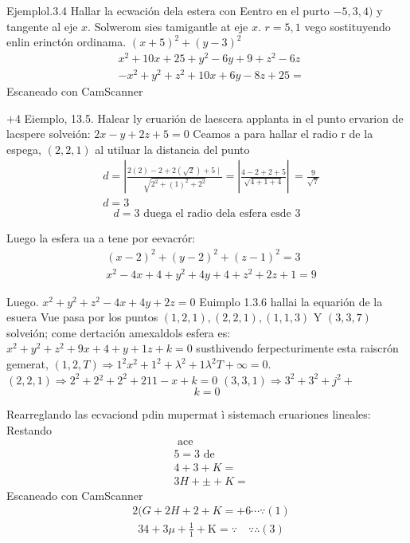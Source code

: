 Ejemplol.3.4 Hallar la ecwación dela estera con Eentro en el purto $-5,3,4)$ y tangente al eje $x$. Solwerom sies tamigantle at eje $x$. $r=5,1$ vego sostituyendo enlin erinctón ordinama. $(x+5)^2+(y-3)^2$
$$
\begin{aligned}
	& x^2+10 x+25+y^2-6 y+9+z^2-6 z \\
	& -x^2+y^2+z^2+10 x+6 y-8 z+25=
\end{aligned}
$$
Escaneado con CamScanner




$+4$
Eiemplo, 13.5. Halear ly eruarión de laescera applanta in el punto ervarion de lacspere solveión: $2 x-y+2 z+5=0$
Ceamos a para hallar el radio r de la espega, $(2,2,1)$ al utiluar la distancia del punto
$$
\begin{aligned}
	& \left.d=\left|\frac{2(2)-2+2(\sqrt{2})+5 \mid}{\sqrt{2^2+(1)^2+2^2}}=\right| \frac{4-2+2+5}{\sqrt{4+1+4}} \right\rvert\,=\frac{9}{\sqrt{7}} \\
	& d=3
\end{aligned}
$$
$$
d=3 \text { duega el radio dela esfera esde } 3
$$

Luego la esfera ua a tene por eevacrór:
$$
\begin{aligned}
	& (x-2)^2+(y-2)^2+(z-1)^2=3 \\
	& x^2-4 x+4+y^2+4 y+4+z^2+2 z+1=9
\end{aligned}
$$

Luego. $x^2+y^2+z^2-4 x+4 y+2 z=0$
Euimplo 1.3.6 hallai la equarión de la esuera Vue pasa por los puntos $(1,2,1),(2,2,1),(1,1,3)$ Y $(3,3,7)$ solveión; come dertación amexaldols esfera es: $x^2+y^2+z^2+9 x+4+y+1 z+k=0$
susthivendo ferpecturimente esta raiscrón gemerat,
$(1,2, T) \Rightarrow 1^2 x^2+1^2+\lambda^2+1 \lambda^2 T+\infty=0$.
$(2,2,1) \Rightarrow 2^2+2{ }^2+2^2+211-x+k=0$
$(3,3,1) \Rightarrow 3^2+3^2+j^2+$
$$
k=0
$$

Rearreglando las ecvaciond pdin mupermat ì sistemach eruariones lineales:
Restando
$$
\begin{aligned}
	& \text { ace } \\
	& 5=3 \text { de } \\
	& 4+3+K= \\
	& 3 H+ \pm+K=
\end{aligned}
$$
Escaneado con CamScanner
$$
\begin{aligned}
	& 2(G+2 H+2+K=+6 \cdots \because(1)
\end{aligned}
$$
$$
\begin{aligned}
	& 34+3 \mu+\frac{1}{1}+\mathrm{K}=\because \quad \because \therefore(3)
\end{aligned}
$$


